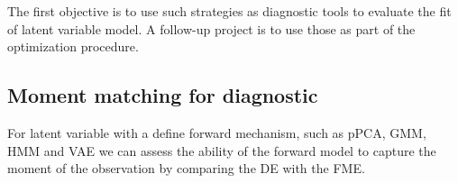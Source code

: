 \documentclass{article}
\begin{document}
\bigskip

The first objective is to use such strategies as diagnostic tools to evaluate the fit of latent variable model. A follow-up project is to use those as part of the optimization procedure. 

\subsection{Moment matching for diagnostic}

For latent variable with a define forward mechanism, such as pPCA, GMM, HMM and VAE we can assess the ability of the forward model to capture the moment of the observation by comparing the DE with the FME.  

\pagebreak


\bigskip
\end{document}
